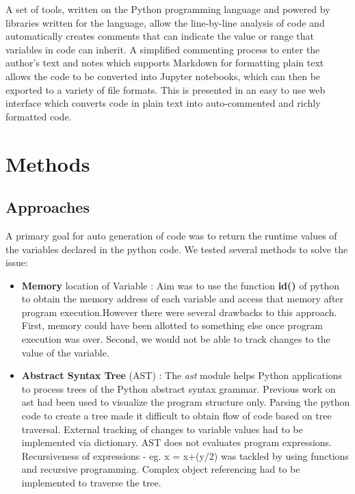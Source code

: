 \documentclass[fleqn,10pt]{wlscirep}
\begin{document}
A set of tools, written on the Python programming language and powered by libraries written for the language, allow the line-by-line analysis of code and automatically creates comments that can indicate the value or range that variables in code can inherit. A simplified commenting process to enter the author's text and notes which supports Markdown\cite{gruber2004markdown} for formatting plain text allows the code to be converted into Jupyter notebooks, which can then be exported to a variety of file formats. This is presented in an easy to use web interface which converts code in plain text into auto-commented and richly formatted code. 

\section*{Methods}

\subsection*{Approaches}

A primary goal for auto generation of code was to return the runtime values of the variables declared in the python code.
We tested several methods to solve the issue:

\begin{itemize}
\item \textbf{Memory} location of Variable : Aim was to use the function \textbf{id()} of python to obtain the memory address of each variable and access that memory after program execution.However there were several drawbacks to this approach. First, memory could have been allotted to something else once program execution was over. Second, we would not be able to track changes to the value of the variable.
\item \textbf{Abstract Syntax Tree} (AST) : The \textit{ast} module helps Python applications to process trees of the Python abstract syntax grammar. Previous work on ast had been used to visualize the program structure only. Parsing the python code to create a tree made it difficult to obtain flow of code based on tree traversal. External tracking of changes to variable values had to be implemented via dictionary. AST does not evaluates program expressions. Recursiveness of expressions - eg. x = x+(y/2) was tackled by using functions and recursive programming. Complex object referencing had to be implemented to traverse the tree.
\end{itemize}
\end{document}
